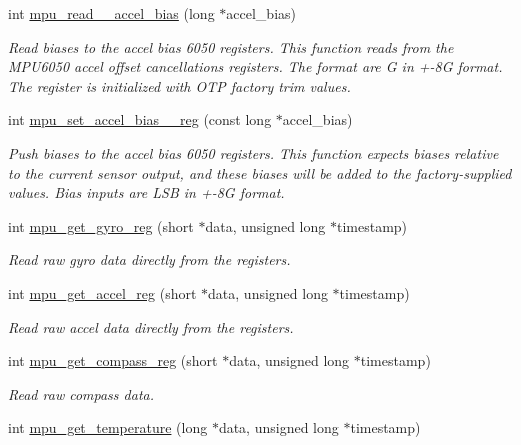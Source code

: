 \begin{DoxyCompactItemize}
int \hyperlink{group___d_r_i_v_e_r_s_gaed37421e1f140d10ee0eff0efeade27b}{mpu\+\_\+read\+\_\+\_\+accel\+\_\+bias} (long $\ast$accel\+\_\+bias)
\begin{DoxyCompactList}\small\item\em Read biases to the accel bias 6050 registers. This function reads from the M\+P\+U6050 accel offset cancellations registers. The format are G in +-\/8G format. The register is initialized with O\+TP factory trim values. \end{DoxyCompactList}\item 
int \hyperlink{group___d_r_i_v_e_r_s_gae2eb5073dacc7455101bf6818e35c40a}{mpu\+\_\+set\+\_\+accel\+\_\+bias\+\_\+\_\+reg} (const long $\ast$accel\+\_\+bias)
\begin{DoxyCompactList}\small\item\em Push biases to the accel bias 6050 registers. This function expects biases relative to the current sensor output, and these biases will be added to the factory-\/supplied values. Bias inputs are L\+SB in +-\/8G format. \end{DoxyCompactList}\item 
int \hyperlink{group___d_r_i_v_e_r_s_ga5555854590ad11495c0e30401294bae2}{mpu\+\_\+get\+\_\+gyro\+\_\+reg} (short $\ast$data, unsigned long $\ast$timestamp)
\begin{DoxyCompactList}\small\item\em Read raw gyro data directly from the registers. \end{DoxyCompactList}\item 
int \hyperlink{group___d_r_i_v_e_r_s_gae4ae960e5df78049ece2647772a3d809}{mpu\+\_\+get\+\_\+accel\+\_\+reg} (short $\ast$data, unsigned long $\ast$timestamp)
\begin{DoxyCompactList}\small\item\em Read raw accel data directly from the registers. \end{DoxyCompactList}\item 
int \hyperlink{group___d_r_i_v_e_r_s_ga65e6b0ce980b8c0255d7be9b55c88c08}{mpu\+\_\+get\+\_\+compass\+\_\+reg} (short $\ast$data, unsigned long $\ast$timestamp)
\begin{DoxyCompactList}\small\item\em Read raw compass data. \end{DoxyCompactList}\item 
int \hyperlink{group___d_r_i_v_e_r_s_gaa449b565a157b4b8ca0f491b7ed46018}{mpu\+\_\+get\+\_\+temperature} (long $\ast$data, unsigned long $\ast$timestamp)

\end{DoxyCompactItemize}

